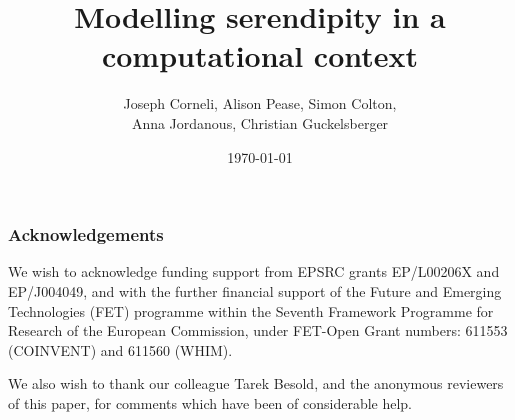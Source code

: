 \documentclass{llncs} %
\begin{document}
\title{Modelling serendipity in a computational context}
\author{Joseph Corneli, Alison Pease, Simon Colton,\\ Anna Jordanous, Christian Guckelsberger}
\date{\today}

\maketitle







% 
% 
% 
















\subsubsection*{Acknowledgements}
We wish to acknowledge funding support from EPSRC grants EP/L00206X and
EP/J004049, and with the further financial support of the Future and Emerging
Technologies (FET) programme within the Seventh Framework Programme
for Research of the European Commission, under FET-Open Grant numbers:
611553 (COINVENT) and 611560 (WHIM).

We also wish to thank our colleague Tarek Besold, and the anonymous
reviewers of this paper, for comments which have been of considerable
help.




% 
\end{document}
